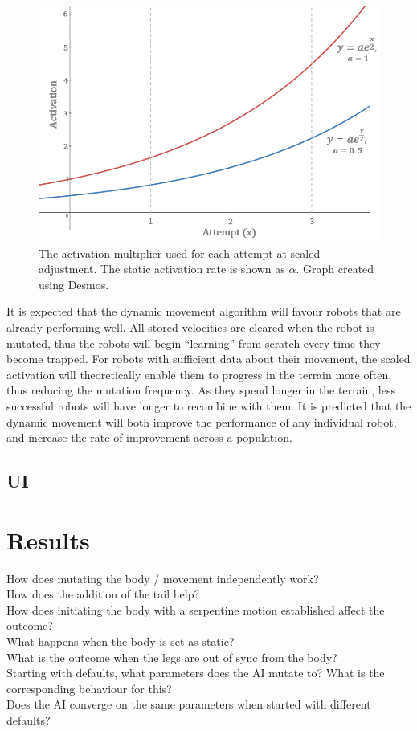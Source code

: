 \documentclass{article}
\begin{document}
\begin{enumerate}
\begin{figure}[H]
\centering
\includegraphics[scale=0.8]{activationFunction}
\caption{The activation multiplier used for each attempt at scaled adjustment. The static activation rate is shown as $\alpha$. Graph created using Desmos. \citep{graphs}}
\end{figure}
\end{enumerate}

It is expected that the dynamic movement algorithm will favour robots that are already performing well. All stored velocities are cleared when the robot is mutated, thus the robots will begin “learning” from scratch every time they become trapped. For robots with sufficient data about their movement, the scaled activation will theoretically enable them to progress in the terrain more often, thus reducing the mutation frequency. As they spend longer in the terrain, less successful robots will have longer to recombine with them. It is predicted that the dynamic movement will both improve the performance of any individual robot, and increase the rate of improvement across a population. \\

\subsection{UI}


\newpage
\section{Results}
How does mutating the body / movement independently work?\\
How does the addition of the tail help?\\
How does initiating the body with a serpentine motion established affect the outcome?\\
What happens when the body is set as static?\\
What is the outcome when the legs are out of sync from the body?\\
Starting with defaults, what parameters does the AI mutate to? What is the corresponding behaviour for this?\\
Does the AI converge on the same parameters when started with different defaults?\\
\end{document}
